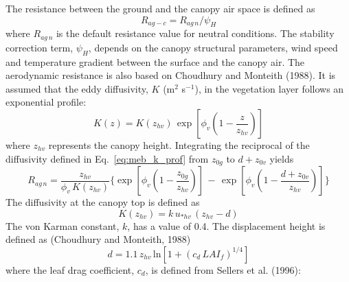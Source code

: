 The resistance between the ground and the canopy air space is defined as
%
\begin{equation}
  \label{eq:meb_resistance_stabcor}
R_{ag-c} = R_{ag\,n}/\psi_H
%
\end{equation}
%
where $R_{ag\,n}$ is the default resistance value for neutral conditions. 
The stability correction term, $\psi_H$, depends on the canopy
structural parameters, wind speed and temperature gradient
between the surface and the canopy air.
%
The aerodynamic resistance is also based on
Choudhury and Monteith (1988)\nocite{Choudhury88}.
It is assumed that the eddy diffusivity, $K$ (m$^2$ s$^{-1}$), 
in the vegetation layer
follows an exponential profile:
%
\begin{equation}
  \label{eq:meb_k_prof}
K\left(z\right) = K\left(z_{hv}\right) \,
\exp\left[\phi_v \left(1-{\frac{z}{z_{hv}}}\right)\right] 
\end{equation}
%
where $z_{hv}$ represents the canopy height.
Integrating the reciprocal of the diffusivity defined
in Eq.~\ref{eq:meb_k_prof} from $z_{0g}$ to $d + z_{0v}$ yields
%
\begin{equation}
  \label{eq:meb_rd}
  R_{ag\,n} = \frac{z_{hv}}{\phi_v \, K\left(z_{hv}\right)}
\Bigg\lbrace
\exp\left[\phi_v \left(1-{\frac{z_{0g}}{z_{hv}}}\right)\right] \,-\, 
\exp\left[\phi_v \left(1-{\frac{d +
             z_{0v}}{z_{hv}}} \right)\right] 
\Bigg\rbrace
\end{equation}
%
The diffusivity at the canopy top is defined as
%
\begin{equation}
  \label{eq:meb_Kh}
  K\left(z_{hv}\right) = k \, u_{\ast hv} \, \left(z_{hv} - d\right) 
\end{equation}
%
The von Karman constant, $k$, has a value of 0.4.
The displacement height is defined as 
(Choudhury and Monteith, 1988)\nocite{Choudhury88}
%
\begin{equation}
  \label{eq:meb_disph}
  d = 1.1 \, z_{hv} \, {\mathrm{ln}}\left[1 + {\left(c_d \, LAI_f\right)}^{1/4}\right]
\end{equation}
%
where
the leaf drag coefficient, $c_d$, is defined from 
Sellers et al. (1996)\nocite{Sellers96}:
